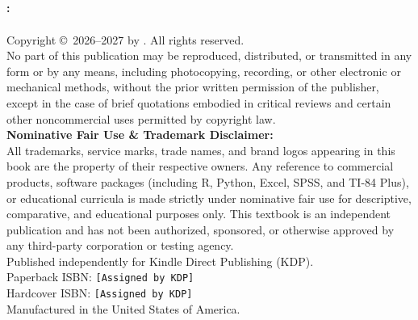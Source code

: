 
\thispagestyle{empty}
\begin{center}
  \vspace*{2cm}
  {\Huge\bfseries\color{MidnightBlue} \BookTitle}\\[12pt]
  {\Large\color{DarkSlateGray} \BookSubtitle}\\[24pt]
  {\large\bfseries \BookSeries}\\[36pt]
  {\Large \BookAuthor}\\[24pt]
  {\normalsize \Edition}
\end{center}
\clearpage

\thispagestyle{empty}
\vspace*{\fill}
\begin{center}
  \begin{minipage}{0.9\linewidth}
    \small
    \textbf{\BookTitle: \BookSubtitle}\\
    \BookSeries\\[6pt]
    Copyright \copyright\ 2026--2027 by \BookAuthor. All rights reserved.\\[10pt]
    No part of this publication may be reproduced, distributed, or transmitted in any form or by any means, including photocopying, recording, or other electronic or mechanical methods, without the prior written permission of the publisher, except in the case of brief quotations embodied in critical reviews and certain other noncommercial uses permitted by copyright law.\\[10pt]
    \textbf{Nominative Fair Use \& Trademark Disclaimer:}\\
    All trademarks, service marks, trade names, and brand logos appearing in this book are the property of their respective owners. Any reference to commercial products, software packages (including R, Python, Excel, SPSS, and TI-84 Plus), or educational curricula is made strictly under nominative fair use for descriptive, comparative, and educational purposes only. This textbook is an independent publication and has not been authorized, sponsored, or otherwise approved by any third-party corporation or testing agency.\\[10pt]
    Published independently for Kindle Direct Publishing (KDP).\\
    Paperback ISBN: \texttt{[Assigned by KDP]}\\
    Hardcover ISBN: \texttt{[Assigned by KDP]}\\
    Manufactured in the United States of America.
  \end{minipage}
\end{center}
\vspace*{\fill}
\clearpage

